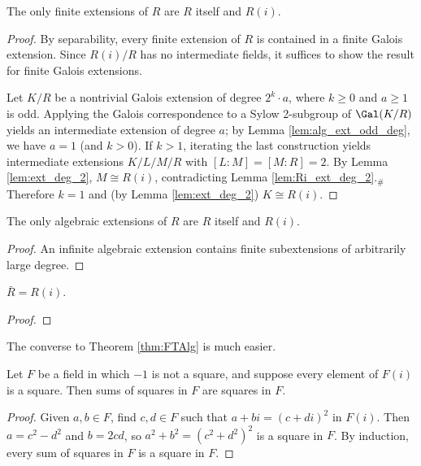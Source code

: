 \begin{theorem}
  \label{thm:FTAlg}
  The only finite extensions of $R$ are $R$ itself and $R(i)$.
\end{theorem}
\begin{proof}
  By separability, every finite extension of $R$ is contained in a finite Galois extension. Since $R(i)/R$ has no intermediate fields, it suffices to show the result for finite Galois extensions.
  
  Let $K/R$ be a nontrivial Galois extension of degree $2^k\cdot a$, where $k\geq 0$ and $a\geq1$ is odd. Applying the Galois correspondence to a Sylow 2-subgroup of $\Gal(K/R)$ yields an intermediate extension of degree $a$; by Lemma \ref{lem:alg_ext_odd_deg}, we have $a=1$ (and $k>0$). If $k>1$, iterating the last construction yields intermediate extensions $K/L/M/R$ with $[L:M]=[M:R]=2$. By Lemma \ref{lem:ext_deg_2}, $M\cong R(i)$, contradicting Lemma \ref{lem:Ri_ext_deg_2}.$_\#$ Therefore $k=1$ and (by Lemma \ref{lem:ext_deg_2}) $K\cong R(i)$.
\end{proof}

\begin{corollary}
  \label{cor:FTAlg_alg}
  The only algebraic extensions of $R$ are $R$ itself and $R(i)$.
\end{corollary}
\begin{proof}
  An infinite algebraic extension contains finite subextensions of arbitrarily large degree.
\end{proof}

\begin{corollary}
  \label{cor:RCF_ac}
  $\bar{R}=R(i)$.
\end{corollary}
\begin{proof}
\end{proof}

The converse to Theorem \ref{thm:FTAlg} is much easier.

\begin{lemma}
  \label{lem:sumsq_is_sq}
  Let $F$ be a field in which $-1$ is not a square, and suppose every element of $F(i)$ is a square. Then sums of squares in $F$ are squares in $F$.
\end{lemma}
\begin{proof}
  Given $a,b\in F$, find $c,d\in F$ such that $a+bi=(c+di)^2$ in $F(i)$. Then $a=c^2-d^2$ and $b=2cd$, so $a^2+b^2=(c^2+d^2)^2$ is a square in $F$. By induction, every sum of squares in $F$ is a square in $F$.
\end{proof}

